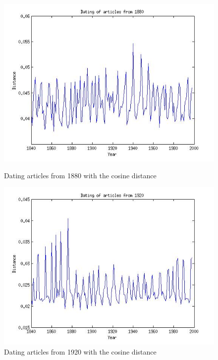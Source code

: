 \begin{figure}[H]
    \begin{minipage}[b]{0.3\linewidth}
        \includegraphics[scale=0.25]{Pictures/date_articles/cos/dating1880.jpg}
        \caption{Dating articles from 1880 with the cosine distance}
    \end{minipage}\hfill
    \begin{minipage}[b]{0.3\linewidth}
        \includegraphics[scale=0.25]{Pictures/date_articles/cos/dating1920.jpg}
        \caption{Dating articles from 1920 with the cosine distance}
    \end{minipage}\hfill
    \begin{minipage}[b]{0.3\linewidth}

\end{minipage}
\end{figure}
